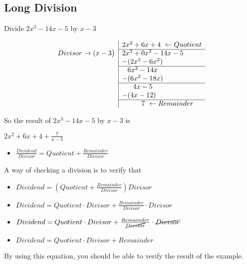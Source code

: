 \documentclass{article}
\begin{document}
\begin{onehalfspace}
    \section{Long Division}

    Divide $2x^{3} - 14x - 5$ by $x - 3$

\[
\begin{array}{r|l}
    & 2x^2 + 6x + 4 \ \leftarrow Quotient\\
    \cline{2-2}
    Divisor \rightarrow  (x - 3 \big) & 2x^3 + 0x^2 - 14x - 5 \\
    & -(2x^3 - 6x^2) \\
    \cline{2-2}
    & \phantom{-}6x^2 - 14x \\
    & -(6x^2 - 18x) \\
    \cline{2-2}
    & \phantom{--}4x - 5 \\
    & -(4x - 12) \\
    \cline{2-2}
    & \phantom{---}7 \ \leftarrow Remainder
\end{array}
\]

So the result of $2x^{3} - 14x - 5$ by $x - 3$ is \par
\begin{center}
    $2x^{2} + 6x + 4 + \frac{7}{x - 3}$
\end{center}

\begin{itemize}
    \item $\frac{Dividend}{Divisor} = Quotient + \frac{Remainder}{Divisor}$
\end{itemize}

A way of checking a division is to verify that \par

\begin{itemize}
    \item $Dividend = \left( Quotient + \frac{Remainder}{Divisor} \right) Divisor$ \par
    \item $Dividend = Quotient \cdot Divisor + \frac{Remainder}{Divisor} \cdot Divisor$ \par
    \item $Dividend = Quotient \cdot Divisor + \frac{Remainder}{\cancel{Divisor}} \cdot \cancel{Divisor}$ \par
    \item $Dividend = Quotient \cdot Divisor + Remainder$\par
\end{itemize}

By using this equation, you should be able to verify the result of the example.
\end{onehalfspace}
\end{document}
